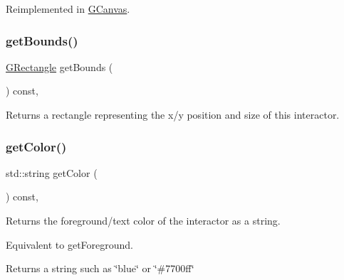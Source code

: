 Reimplemented in \mbox{\hyperlink{classsgl_1_1GCanvas_acd4f2b3b9619dacdfd71fc0004cac382}{G\+Canvas}}.

\mbox{\label{classsgl_1_1GInteractor_a29e6ac35a0b48f491a4c88194cc5da3b}} 
\subsubsection{\texorpdfstring{get\+Bounds()}{getBounds()}}
{\footnotesize\ttfamily \mbox{\hyperlink{structsgl_1_1GRectangle}{G\+Rectangle}} get\+Bounds (\begin{DoxyParamCaption}{ }\end{DoxyParamCaption}) const\hspace{0.3cm}{\ttfamily [virtual]}, {\ttfamily [inherited]}}



Returns a rectangle representing the x/y position and size of this interactor. 

\mbox{\label{classsgl_1_1GInteractor_aa061dfa488c31e18549d64363c1d0e34}} 
\subsubsection{\texorpdfstring{get\+Color()}{getColor()}}
{\footnotesize\ttfamily std\+::string get\+Color (\begin{DoxyParamCaption}{ }\end{DoxyParamCaption}) const\hspace{0.3cm}{\ttfamily [virtual]}, {\ttfamily [inherited]}}



Returns the foreground/text color of the interactor as a string. 

Equivalent to get\+Foreground. \begin{DoxyReturn}{Returns}
a string such as \char`\"{}blue\char`\"{} or \char`\"{}\#7700ff\char`\"{} 
\end{DoxyReturn}
\mbox{\label{classsgl_1_1GInteractor_a9635c7af766cdc3417f346683fa0e6c1}} 
